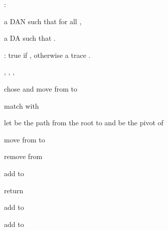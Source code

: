 \documentclass{llncs}
\begin{document}
\begin{algorithm}[t!]
{\scriptsize\begin{algorithmic}[0]
  : 
  \begin{compactenum}
    \item a DAN  such that 
      for all ,
\item a DA 
      such that  .
  \end{compactenum}
  : true if , otherwise a trace  .
\end{algorithmic}

\begin{algorithmic}[1]
  \State  , , 
  , 
  \label{ln:init}

  \While {}\label{ln:beginWhile}

  \State chose  and move
   from  to
  \label{ln:move}

  \State match  with 

  \label{ln:ifAccepting}

  \State let  be the path from the root to  and  be the pivot of \label{ln:pivot}

  \If{}\label{ln:spuriousnessCheck}

  \State \label{ln:updateMap}

  \State \label{ln:subTree}

  \For{}\label{ln:forSubRem}

  \State move  from  to \label{ln:moveNext}

  \EndFor

  \State remove  from \label{ln:removeSubTree}

  \State add  to \label{ln:addPivot}

  \Else 
  
  \State return \label{ln:realCEXreport}

  \EndIf 

  \Else

  \State 

  \For{}\label{ln:post}


  \State add  to \label{ln:addSubsume}

  \Else

  \State \label{ln:rem}

  \State \label{ln:buildSucc}

  \State 

  \For{}

  \State add  to \label{ln:addSuccSubsume}


\end{algorithmic}}
\end{algorithm}
\end{document}
